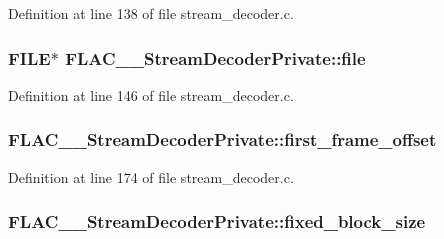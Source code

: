 Definition at line 138 of file stream\+\_\+decoder.\+c.

\subsubsection[{\texorpdfstring{file}{file}}]{\setlength{\rightskip}{0pt plus 5cm}F\+I\+LE$\ast$ F\+L\+A\+C\+\_\+\+\_\+\+Stream\+Decoder\+Private\+::file}\hypertarget{struct_f_l_a_c_____stream_decoder_private_a9a740ff26d94d14540d94e21e14a7cf6}{}\label{struct_f_l_a_c_____stream_decoder_private_a9a740ff26d94d14540d94e21e14a7cf6}


Definition at line 146 of file stream\+\_\+decoder.\+c.

\subsubsection[{\texorpdfstring{first\+\_\+frame\+\_\+offset}{first_frame_offset}}]{ F\+L\+A\+C\+\_\+\+\_\+\+Stream\+Decoder\+Private\+::first\+\_\+frame\+\_\+offset}\hypertarget{struct_f_l_a_c_____stream_decoder_private_aeaafb2d6b143fe7ed243ed6e8a11a859}{}\label{struct_f_l_a_c_____stream_decoder_private_aeaafb2d6b143fe7ed243ed6e8a11a859}


Definition at line 174 of file stream\+\_\+decoder.\+c.

\subsubsection[{\texorpdfstring{fixed\+\_\+block\+\_\+size}{fixed_block_size}}]{ F\+L\+A\+C\+\_\+\+\_\+\+Stream\+Decoder\+Private\+::fixed\+\_\+block\+\_\+size}\hypertarget{struct_f_l_a_c_____stream_decoder_private_a89321201d5edb2bd6ead99e7c2da1c36}{}\label{struct_f_l_a_c_____stream_decoder_private_a89321201d5edb2bd6ead99e7c2da1c36}


